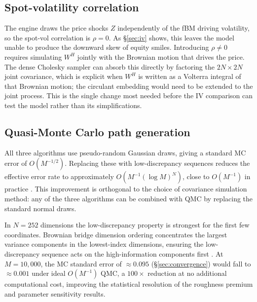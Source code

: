 \subsection{Spot-volatility correlation}
\label{sec:rho-future}

The engine draws the price shocks $Z$ independently of the fBM driving
volatility, so the spot-vol correlation is $\rho = 0$.  As §\ref{sec:iv} shows,
this leaves the model unable to produce the downward skew of equity smiles.
Introducing $\rho \neq 0$ requires simulating $W^H$ jointly with the Brownian motion
that drives the price.  The dense Cholesky sampler can absorb this directly by
factoring the $2N \times 2N$ joint covariance, which is explicit when $W^H$ is
written as a Volterra integral of that Brownian motion; the circulant embedding
would need to be extended to the joint process.  This is the single change most
needed before the IV comparison can test the model rather than its
simplifications.

\subsection{Quasi-Monte Carlo path generation}
\label{sec:qmc-future}

All three algorithms use pseudo-random Gaussian draws, giving a standard MC
error of $O(M^{-1/2})$.  Replacing these with low-discrepancy sequences
\citep{niederreiter1992random} reduces the effective error rate to
approximately $O(M^{-1}(\log M)^N)$, close to $O(M^{-1})$ in practice
\citep{glasserman2004monte}.  This improvement is orthogonal to the
choice of covariance simulation method: any of the three algorithms can be
combined with QMC by replacing the standard normal draws.

In $N = 252$ dimensions the low-discrepancy property is strongest for the
first few coordinates.  Brownian bridge dimension ordering concentrates the
largest variance components in the lowest-index dimensions, ensuring the
low-discrepancy sequence acts on the high-information components first
\citep{joy1996quasi}.  At $M = 10{,}000$, the MC standard error of
$\approx 0.095$ (§\ref{sec:convergence}) would fall to $\approx 0.001$ under
ideal $O(M^{-1})$ QMC, a $100\times$ reduction at no additional computational
cost, improving the statistical resolution of the roughness premium and
parameter sensitivity results.
